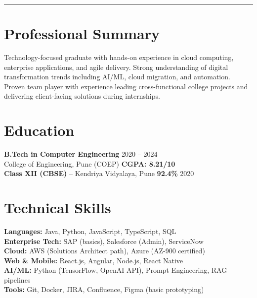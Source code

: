 \documentclass[10pt,a4paper]{article}
\begin{document}
\\[4pt]
\\[2pt]
\\[2pt]
{\color{accent}\rule{\textwidth}{2pt}}

\section{Professional Summary}
Technology-focused graduate with hands-on experience in cloud computing, enterprise applications, and agile delivery. Strong understanding of digital transformation trends including AI/ML, cloud migration, and automation. Proven team player with experience leading cross-functional college projects and delivering client-facing solutions during internships.

\section{Education}
\textbf{B.Tech in Computer Engineering} \hfill 2020 -- 2024\\
College of Engineering, Pune (COEP) \hfill \textbf{CGPA: 8.21/10}\\[3pt]
\textbf{Class XII (CBSE)} -- Kendriya Vidyalaya, Pune \hfill \textbf{92.4\%} \hfill 2020

\section{Technical Skills}
\textbf{Languages:} Java, Python, JavaScript, TypeScript, SQL\\
\textbf{Enterprise Tech:} SAP (basics), Salesforce (Admin), ServiceNow\\
\textbf{Cloud:} AWS (Solutions Architect path), Azure (AZ-900 certified)\\
\textbf{Web \& Mobile:} React.js, Angular, Node.js, React Native\\
\textbf{AI/ML:} Python (TensorFlow, OpenAI API), Prompt Engineering, RAG pipelines\\
\textbf{Tools:} Git, Docker, JIRA, Confluence, Figma (basic prototyping)
\end{document}
